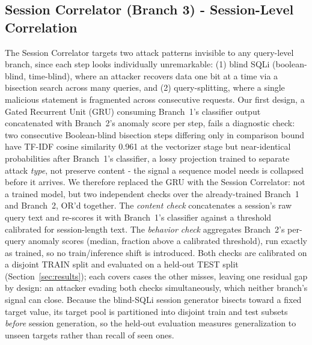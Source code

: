 \documentclass[conference]{IEEEtran}
\begin{document}
\subsection{Session Correlator (Branch 3) - Session-Level Correlation}
The Session Correlator targets two attack patterns invisible to any query-level branch, since each step looks individually unremarkable: (1) blind SQLi (boolean-blind, time-blind), where an attacker recovers data one bit at a time via a bisection search across many queries, and (2) query-splitting, where a single malicious statement is fragmented across consecutive requests. Our first design, a Gated Recurrent Unit (GRU) consuming Branch~1's classifier output concatenated with Branch~2's anomaly score per step, fails a diagnostic check: two consecutive Boolean-blind bisection steps differing only in comparison bound have TF-IDF cosine similarity 0.961 at the vectorizer stage but near-identical probabilities after Branch~1's classifier, a lossy projection trained to separate attack \emph{type}, not preserve content - the signal a sequence model needs is collapsed before it arrives. We therefore replaced the GRU with the Session Correlator: not a trained model, but two independent checks over the already-trained Branch~1 and Branch~2, OR'd together. The \emph{content check} concatenates a session's raw query text and re-scores it with Branch~1's classifier against a threshold calibrated for session-length text. The \emph{behavior check} aggregates Branch~2's per-query anomaly scores (median, fraction above a calibrated threshold), run exactly as trained, so no train/inference shift is introduced. Both checks are calibrated on a disjoint TRAIN split and evaluated on a held-out TEST split (Section~\ref{sec:results}); each covers cases the other misses, leaving one residual gap by design: an attacker evading both checks simultaneously, which neither branch's signal can close. Because the blind-SQLi session generator bisects toward a fixed target value, its target pool is partitioned into disjoint train and test subsets \emph{before} session generation, so the held-out evaluation measures generalization to unseen targets rather than recall of seen ones.
\end{document}

